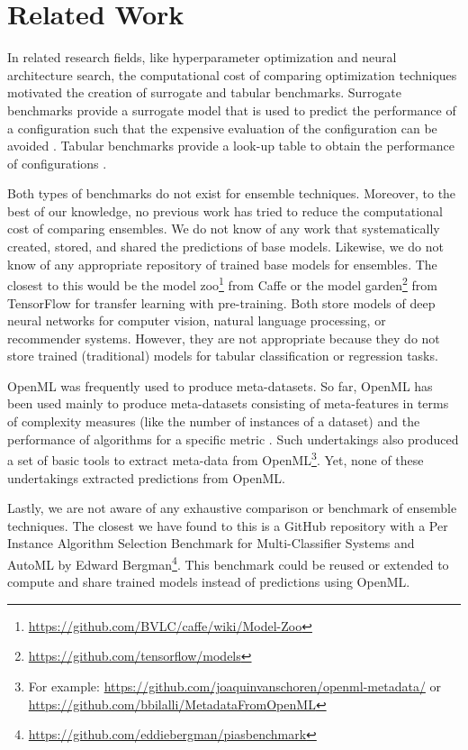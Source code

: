 \documentclass[11pt]{article}
\begin{document}
\section{Related Work}
In related research fields, like hyperparameter optimization and neural architecture search, the computational cost of comparing optimization techniques motivated the creation of surrogate and tabular benchmarks.  
Surrogate benchmarks provide a surrogate model that is used to predict the performance of a configuration such that the expensive evaluation of the configuration can be avoided \citep{DBLP:conf/aaai/EggenspergerHHL15}. 
Tabular benchmarks provide a look-up table to obtain the performance of configurations \citep{DBLP:conf/icml/YingKCR0H19,klein2019tabular}.

Both types of benchmarks do not exist for ensemble techniques. Moreover, to the best of our knowledge, no previous work has tried to reduce the computational cost of comparing ensembles. We do not know of any work that systematically created, stored, and shared the predictions of base models. 
Likewise, we do not know of any appropriate repository of trained base models for ensembles. 
The closest to this would be the model zoo\footnote{\url{https://github.com/BVLC/caffe/wiki/Model-Zoo}} from Caffe \citep{jia2014caffe} or the model garden\footnote{\url{https://github.com/tensorflow/models}} from TensorFlow \citep{tensorflowmodelgarden2020} for transfer learning with pre-training. Both store models of deep neural networks for computer vision, natural language processing, or recommender systems.
However, they are not appropriate because they do not store trained (traditional) models for tabular classification or regression tasks.

OpenML was frequently used to produce meta-datasets. So far, OpenML has been used mainly to produce meta-datasets consisting of meta-features in terms of complexity measures (like the number of instances of a dataset) and the performance of algorithms for a specific metric \citep{bilalli2017predictive, tornede2020extreme, olier2018transformative, kuhn2018automatic}. Such undertakings also produced a set of basic tools to extract meta-data from OpenML\footnote{For example: \url{https://github.com/joaquinvanschoren/openml-metadata/} or \url{https://github.com/bbilalli/MetadataFromOpenML}}.
Yet, none of these undertakings extracted predictions from OpenML.

Lastly, we are not aware of any exhaustive comparison or benchmark of ensemble techniques. The closest we have found to this is a GitHub repository with a Per Instance Algorithm Selection Benchmark for Multi-Classifier Systems and AutoML by Edward Bergman\footnote{\url{https://github.com/eddiebergman/piasbenchmark}}. This benchmark could be reused or extended to compute and share trained models instead of predictions using OpenML. 
\end{document}
